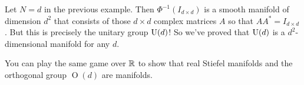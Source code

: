 	\begin{example}
		Let $N=d$ in the previous example. Then $\Phi^{-1}(I_{d \times d})$ is a smooth manifold of dimension $d^2$ that consists of those $d \times d$ complex matrices $A$ so that $AA^\ast = I_{d \times d}$. But this is precisely the unitary group $\operatorname{U}(d)$! So we've proved that $\operatorname{U}(d)$ is a $d^2$-dimensional manifold for any $d$.
	\end{example}
	
	\begin{remark}
		You can play the same game over $\mathbb{R}$ to show that real Stiefel manifolds and the orthogonal group $\operatorname{O}(d)$ are manifolds.
	\end{remark}
